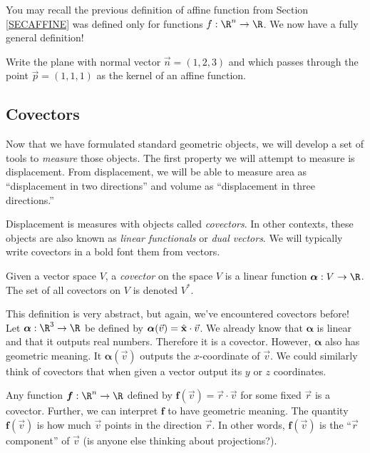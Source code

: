 You may recall the previous definition of affine function from Section \ref{SECAFFINE}
was defined only for functions $f:\R^n\to \R$.  We now have a fully general
definition!

\begin{exercise}
	Write the plane with normal vector $\vec n=(1,2,3)$ and which
	passes through the point $\vec p=(1,1,1)$ as the kernel of an 
	affine function.
\end{exercise}

\subsection{Covectors}

Now that we have formulated standard geometric objects, we will develop
a set of tools to \emph{measure} those objects.  The first
property we will attempt to measure is displacement.  From displacement,
we will be able to measure area as ``displacement in two directions''
and volume as ``displacement in three directions.''

Displacement is measures with objects called \emph{covectors}.
In other contexts, these objects are also known as 
\emph{linear functionals} or \emph{dual vectors}.
We will typically write covectors in a bold font them from vectors.

\begin{definition}[Covector]
	Given a vector space $V$, a \emph{covector} on the space $V$
	is a linear function $\bm{\alpha}:V\to \R$.  The set of all
	covectors on $V$ is denoted $V^*$.
\end{definition}

This definition is very abstract, but again, we've encountered covectors
before!  Let $\bm{\alpha}:\R^3\to\R$ be defined by $\bm{\alpha}(\vec v) ={\hat {\mathbf x}} \cdot \vec v$.
We already know that $\bm{\alpha}$ is linear and that it outputs
real numbers.  Therefore it is a covector.  However, $\bm \alpha$ also has
geometric meaning.  It $\bm\alpha(\vec v)$ outputs the $x$-coordinate
of $\vec v$.  We could similarly think of covectors that when given
a vector output its $y$ or $z$ coordinates.

Any function $\bm f:\R^n\to \R$ defined by $\bm f(\vec v) = \vec r\cdot \vec v$
for some fixed $\vec r$ is a covector.  Further, we can interpret
$\bm f$ to have geometric meaning.  The quantity $\bm f(\vec v)$ is how
much $\vec v$ points in the direction $\vec r$.  In other words, $\bm f(\vec v)$
is the ``$\vec r$ component'' of $\vec v$ (is anyone else thinking
about projections?).

